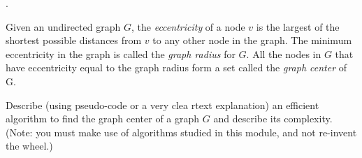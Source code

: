 \documentclass[12pt]{article}
\newcounter{quesnum}
\newcommand{\question}[2][??]{
\begin{list}{\labelitemi}{\leftmargin=2em}
\item [\arabic{quesnum}.] {#2}
\end{list}
\addtocounter{quesnum}{1}
}
\begin{document}
\question[1]{
Given an undirected graph $G$, the {\em eccentricity} of a node $v$ is the largest of the shortest possible distances from $v$ to any other node in the graph. The minimum eccentricity in the graph is called the  {\em graph radius} for $G$. All the nodes in $G$ that have eccentricity equal to the graph radius form a set called the {\em graph center} of G.

Describe (using pseudo-code or a very clea rtext explanation) an efficient algorithm to find the graph center of a graph $G$ and describe its complexity.  (Note: you must make use of algorithms studied in this module, and not  re-invent the wheel.)
}
\fi
\end{document}
